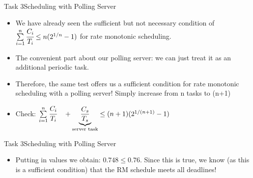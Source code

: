 \begin{frame}{Task 3}{Scheduling with Polling Server}
    \begin{solutionnoinc}
    \begin{itemize}
        \item We have already seen the sufficient but not necessary condition of $\sum\limits_{i=1}^{n}\cfrac{C_i}{T_i} \leq n(2^{1/n}-1)$ for rate monotonic scheduling.
        \item The convenient part about our polling server: we can just treat it as an additional \alert{periodic} task.
        \item Therefore, the same test offers us a sufficient condition for rate monotonic scheduling with a polling server! Simply increase from n tasks to (n+1)
        \item Check: $\sum\limits_{i=1}^{n}\cfrac{C_i}{T_i} \quad + \underbrace{\frac{C_s}{T_s}}_{\text{server task}} \leq (n+1)(2^{1/(n+1)}-1)$
    \end{itemize}
    \end{solutionnoinc}
\end{frame}
\begin{frame}{Task 3}{Scheduling with Polling Server}
    \begin{solution}
    \begin{itemize}
        \item Putting in values we obtain: $0.748 \leq 0.76$. Since this is true, we know (as this is a sufficient condition) that the RM schedule meets all deadlines!
    \end{itemize}
    \end{solution}
\end{frame}
